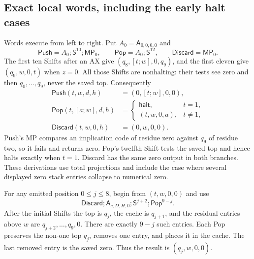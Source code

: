 \subsection{Exact local words, including the early halt cases}

Words execute from left to right. Put $A_0=\mathsf A_{0,0,0,0}$ and
\[
 \mathsf{Push}=A_0;\mathsf S^{10};\mathsf{MP}_0,
 \qquad\mathsf{Pop}=A_0;\mathsf S^{12},
 \qquad\mathsf{Discard}=\mathsf{MP}_0.
\]
The first ten Shifts after an AX give
$(q_8,[t;w],0,q_9)$, and the first eleven give
$(q_9,w,0,t)$ when $z=0$. All those Shifts are nonhalting: their tests
see zero and then $q_0,\ldots,q_9$, never the saved top. Consequently
\begin{align*}
 \mathsf{Push}(t,w,d,h)&=(0,[t;w],0,0),\\
 \mathsf{Pop}(t,[a;w],d,h)&=
 \begin{cases}
   \mathsf{halt},&t=1,\\
   (t,w,0,a),&t\ne1,
 \end{cases}\\
 \mathsf{Discard}(t,w,0,h)&=(0,w,0,0).
\end{align*}
Push's MP compares an implication code of residue zero against $q_9$
of residue two, so it fails and returns zero. Pop's twelfth Shift tests
the saved top and hence halts exactly when $t=1$. Discard has the same
zero output in both branches. These derivations use total projections
and include the case where several displayed zero stack entries collapse
to numerical zero.

For any emitted position $0\le j\le8$, begin from $(t,w,0,0)$ and use
\begin{equation}
 \mathsf{Discard};\mathsf A_{c,D,H,0};
             \mathsf S^{j+2};\mathsf{Pop}^{9-j}.            \tag{GD-Sel}
\end{equation}
After the initial Shifts the top is $q_j$, the cache is $q_{j+1}$,
and the residual entries above $w$ are $q_{j+2},\ldots,q_9,0$.
There are exactly $9-j$ such entries. Each Pop preserves the non-one
top $q_j$, removes one entry, and places it in the cache. The last
removed entry is the saved zero. Thus the result is $(q_j,w,0,0)$.

